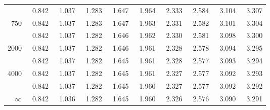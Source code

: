 \begin{center}
\begin{tabular}{r | rrr rr rrrr}
\gray	600	&	~0.842	&	~1.037	&	~1.283	&	~1.647	&	~1.964	&	~2.333	&	~2.584	&	~3.104	&	~3.307	\\
	750	&	~0.842	&	~1.037	&	~1.283	&	~1.647	&	~1.963	&	~2.331	&	~2.582	&	~3.101	&	~3.304	\\
\gray   1000	&	~0.842	&	~1.037	&	~1.282	&	~1.646	&	~1.962	&	~2.330	&	~2.581	&	~3.098	&	~3.300	\\
\hline
\hline
	2000	&	~0.842	&	~1.037	&	~1.282	&	~1.646	&	~1.961	&	~2.328	&	~2.578	&	~3.094	&	~3.295	\\
\gray        3000	&	~0.842	&	~1.037	&	~1.282	&	~1.645	&	~1.961	&	~2.328	&	~2.577	&	~3.093	&	~3.294	\\
 4000	&	~0.842	&	~1.037	&	~1.282	&	~1.645	&	~1.961	&	~2.327	&	~2.577	&	~3.092	&	~3.293	\\
\gray        5000	&	~0.842	&	~1.037	&	~1.282	&	~1.645	&	~1.960	&	~2.327	&	~2.577	&	~3.092	&	~3.292	\\
   $\infty$ &  ~0.842  &   ~1.036  &   ~1.282  &   ~1.645  &   ~1.960  &   ~2.326  &   ~2.576  &   ~3.090  &   ~3.291  \\
    \hline

\end{tabular}
\end{center}
